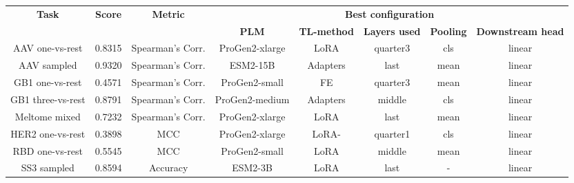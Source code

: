 \documentclass{standalone}
\begin{document}
\begin{tabular}{c|ccccccc}
\hline
\multirow{2}{*}{\textbf{Task}} & \multicolumn{1}{c|}{\multirow{2}{*}{\textbf{Score}}} & \multicolumn{1}{c|}{\multirow{2}{*}{\textbf{Metric}}} & \multicolumn{5}{c}{\textbf{Best configuration}} \\ \cline{4-8}
 & \multicolumn{1}{c|}{} & \multicolumn{1}{c|}{} & \textbf{PLM} & \textbf{TL-method} & \textbf{Layers used} & \textbf{Pooling} & \textbf{Downstream head} \\ \hline
AAV one-vs-rest & 0.8315 & Spearman's Corr. & ProGen2-xlarge & LoRA & quarter3 & cls & linear \\ \hline
AAV sampled & 0.9320 & Spearman's Corr. & ESM2-15B & Adapters & last & mean & linear \\ \hline
GB1 one-vs-rest & 0.4571 & Spearman's Corr. & ProGen2-small & FE & quarter3 & mean & linear \\ \hline
GB1 three-vs-rest & 0.8791 & Spearman's Corr. & ProGen2-medium & Adapters & middle & cls & linear \\ \hline
Meltome mixed & 0.7232 & Spearman's Corr. & ProGen2-xlarge & LoRA & last & mean & linear \\ \hline
HER2 one-vs-rest & 0.3898 & MCC & ProGen2-xlarge & LoRA- & quarter1 & cls & linear \\ \hline
RBD one-vs-rest & 0.5545 & MCC & ProGen2-small & LoRA & middle & mean & linear \\ \hline
SS3 sampled & 0.8594 & Accuracy & ESM2-3B & LoRA & last & - & linear \\ \hline
\end{tabular}
\end{document}
